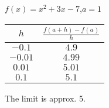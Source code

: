 {$f(x) = x^2+3x-7$,\quad  $a=1$}
{\begin{tabular}{cc}
$h$ & $\frac{f(a+h)-f(a)}{h}$\\ \hline 
 $-0.1$ & $4.9$ \\
 $-0.01$ & $4.99$ \\
 $0.01$ & $5.01$ \\
 $0.1$ & $5.1$
\end{tabular}
The limit is approx. 5.
}


